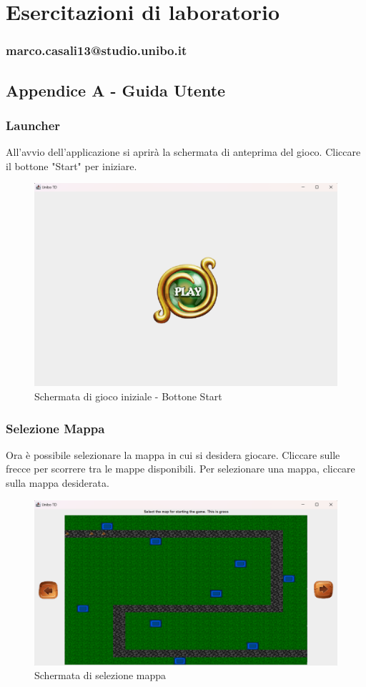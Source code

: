 \documentclass[a4paper,12pt]{report}
\begin{document}
\chapter{Esercitazioni di laboratorio}
\subsection{marco.casali13@studio.unibo.it}
\newpage
\section{Appendice A - Guida Utente}
\subsection{Launcher}
All'avvio dell'applicazione si aprirà la schermata di anteprima del gioco. Cliccare il bottone "Start" per iniziare.
\begin{figure}[H]
    \centering
    \includegraphics[scale=1.2]{Start}
    \caption{Schermata di gioco iniziale - Bottone Start}
    \label{fig:start}
\end{figure}
\subsection{Selezione Mappa}
Ora è possibile selezionare la mappa in cui si desidera giocare. Cliccare sulle frecce per scorrere tra le mappe disponibili. Per selezionare una mappa, cliccare sulla mappa desiderata.
\begin{figure}[H]
    \centering
    \includegraphics[scale=1.2]{map}
    \caption{Schermata di selezione mappa}
    \label{fig:map}
\end{figure}
\end{document}
